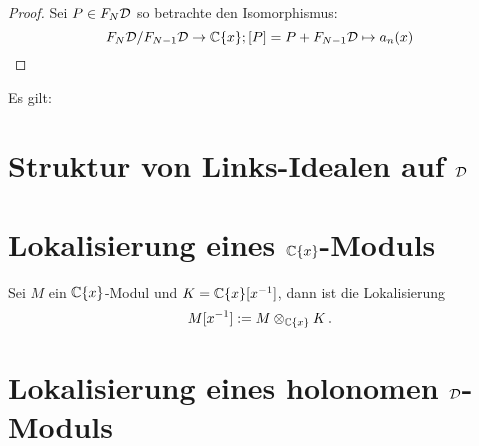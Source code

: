 \begin{proof}
  Sei $P\in F_N\mathcal{D}$ so betrachte den Isomorphismus:
  \[
    F_N\mathcal{D}\slash F_{N-1}\mathcal{D}\rightarrow \mathbb{C}\{x\}; [P]=P+F_{N-1}\mathcal{D}\mapsto a_n(x)
  \]
\end{proof}

\begin{prop}
  Es gilt:
  \begin{center}
  \end{center}
\end{prop}

\begin{comment}
  \subsection{Weyl Algebra als Graduierter Ring}
  Sei $A$ nun einer der drei Koeffizienten Ringe, welche zuvor behandelt
  wurden.  Der Ring $A<\partial_x>$ kommt zusammen mit einer aufsteigenden
  Filtrierung, welche wir mit $F(A<\partial_x)$ bezeichen werden.  Sei $P$ ein
  bzgl. \ref{prop:weyl_eindeutige_schreibung} minimal geschriebener Operator,
  so ist $P$ in $F_k$ falls der maximale Grad von $\partial_x$ in $P$ kleiner
  oder gleich $k$. So definiere den Grad $deg P$ von $P$ als die Eindeutige
  ganze Zahl $k$ mit $P\in F_kA<\partial_x>\slash F_{k-1}<\partial_x>$

  Unabhängigkeit von Schreibung wird in Sabbah Script behauptet
\end{comment}

\section{Struktur von Links-Idealen auf $\mathcal{D}$}

\section{Lokalisierung eines $\mathbb{C}\{x\}$-Moduls}

\begin{defn}
  Sei $M$ ein $\mathbb{C}\{x\}$-Modul und $K=\mathbb{C}\{x\}[x^{-1}]$, dann ist die
  Lokalisierung
  \[ M[x^{-1}]:=M\otimes_{\mathbb{C}\{x\}}K \,. \]
\end{defn}

\section{Lokalisierung eines holonomen $\mathcal{D}$-Moduls}

